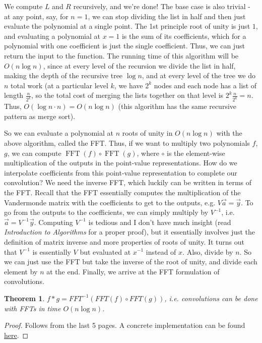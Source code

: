 \documentclass[11pt, oneside]{article}
\theoremstyle{plain}
\newtheorem{theorem}{Theorem}[section]
\theoremstyle{definition}
\DeclareMathOperator{\FFT}{FFT}
\begin{document}
We compute \( L \) and \( R \) recursively, and we're done!
The base case is also trivial - at any point, say, for \( n = 1 \), we can
stop dividing the list in half and then just evaluate the polynomial
at a single point. The 1st principle root of unity is just \( 1 \), and
evaluating a polynomial at \( x = 1 \) is the sum of its coefficients, which for 
a polynomial with one coefficient is just the single coefficient.
Thus, we can just return the input to the function. 
The running time of this algorithm will be \( O(n \log n ) \), since at every
level of the recursion we divide the list in half, making the depth of the
recursive tree \( \log n \), and at every level of the tree we do \( n \) 
total work (at a particular level \( k \), we have \( 2^k \) nodes and
each node has a list of length \( \frac{n}{2^k} \), so the total cost of
merging the lists together on that level is \( 2^k \frac{n}{2^k} = n \).
Thus, \( O(\log n \cdot n) = O(n \log n) \)
(this algorithm has the same recursive pattern as merge sort).

So we can evaluate a polynomial at \( n \) roots of unity in \( O(n \log n) \)
with the above algorithm, called the FFT.
Thus, if we want to multiply two polynomials \( f \), \( g \), we can compute
\( \FFT(f) \circ \FFT(g) \), where \( \circ \) is the element-wise
multiplication of the outputs in the point-value representations.
How do we interpolate coefficients from this point-value representation to
complete our convolution? We need the inverse FFT, which luckily can be written
in terms of the FFT. Recall that the FFT essentially computes the 
multiplication of the Vandermonde matrix with the coefficients to get to the
outputs, e.g. \( V \vec{a} = \vec{y} \). To go from the outputs to the
coefficients, we can simply multiply by \( V^{-1} \), i.e.
\( \vec{a} = V^{-1} \vec{y} \). Computing \( V^{-1} \) is tedious and I don't
have much insight (read \textit{Introduction to Algorithms} for a proper proof),
but it essentially involves just the definition of matrix inverse and more
properties of roots of unity. It turns out that \( V^{-1} \) is essentially
\( V \) but evaluated at \( x^{-1} \) instead of \( x \).
Also, divide by \( n \). So we can just use the FFT but take the inverse of the
root of unity, and divide each element by \( n \) at the end.
Finally, we arrive at the FFT formulation of convolutions.
\begin{theorem}
  \( f * g = FFT^{-1}(FFT(f) \circ FFT(g)) \), i.e. convolutions 
  can be done with FFTs in time \( O(n \log n) \).
\end{theorem}
\begin{proof}
Follows from the last 5 pages.
A concrete implementation can be found 
\href{https://gist.github.com/stephen-huan/aa609965c86d750736398c28b025f9be#fast-fourier-transform}{here}.
\end{proof}
\end{document}

